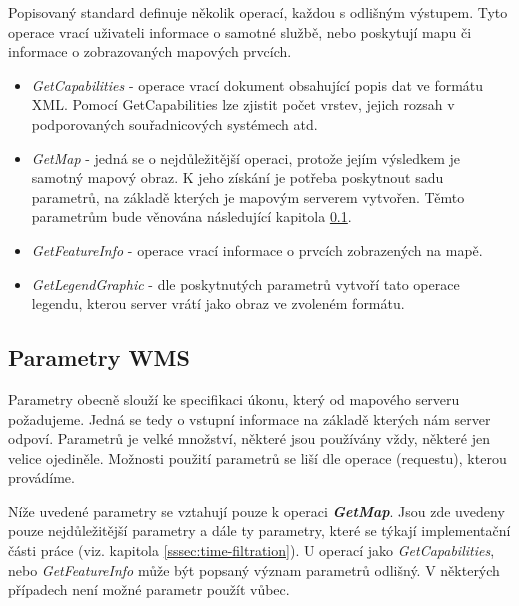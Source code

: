Popisovaný standard definuje několik operací, každou s odlišným
výstupem. Tyto operace vrací uživateli informace o
samotné službě, nebo poskytují mapu či informace o zobrazovaných
mapových prvcích.

\begin{itemize}

\item\textit{GetCapabilities} - operace vrací dokument obsahující popis 
  dat ve formátu XML.
  Pomocí GetCapabilities lze zjistit počet vrstev, jejich
  rozsah v podporovaných souřadnicových systémech atd.
	
\item\textit{GetMap} - jedná se o nejdůležitější operaci, protože
  jejím výsledkem je samotný mapový obraz. K jeho
  získání je potřeba poskytnout sadu parametrů, na základě kterých je
  mapovým serverem vytvořen. Těmto parametrům bude věnována následující
  kapitola \ref{sssec:wms-param}.
	
\item\textit{GetFeatureInfo} - operace vrací informace o prvcích
  zobrazených na mapě.
	
\item\textit{GetLegendGraphic} - dle poskytnutých parametrů vytvoří
  tato operace legendu, kterou server vrátí jako obraz ve zvoleném
  formátu.
\end{itemize}

\subsection{Parametry WMS}
\label{sssec:wms-param}

Parametry obecně slouží ke specifikaci úkonu, který od mapového
serveru požadujeme. Jedná se tedy o vstupní informace na základě
kterých nám server odpoví. Parametrů je velké množství, některé jsou
používány vždy, některé jen velice ojediněle. Možnosti použití
parametrů se liší dle operace (requestu), kterou provádíme.

Níže uvedené parametry se vztahují pouze k operaci
\textbf{\textit{GetMap}}. Jsou zde uvedeny pouze nejdůležitější parametry a dále ty parametry, které se týkají implementační části práce (viz. kapitola \ref{sssec:time-filtration}). U operací jako \textit{GetCapabilities},
nebo \textit{GetFeatureInfo} může být popsaný význam parametrů odlišný.
V některých případech není možné parametr použít vůbec.

